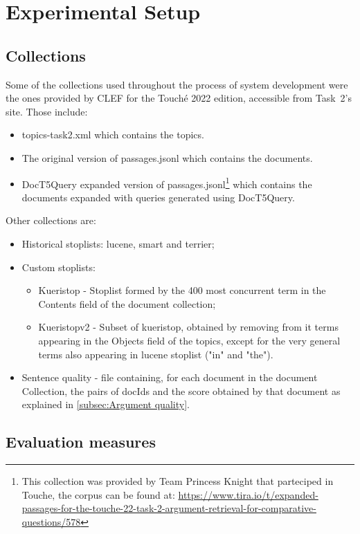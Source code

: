 \section{Experimental Setup}
\label{sec:setup}

\subsection{Collections}

	Some of the collections used throughout the process of system development were the ones provided by CLEF for the Touché 2022 edition, accessible from Task~2's site. Those include:

	\begin{itemize}
		\item topics-task2.xml which contains the topics.
		\item The original version of passages.jsonl which contains the documents.
		\item DocT5Query expanded version of passages.jsonl\footnote{This collection was provided by Team Princess Knight that parteciped in Touche, the corpus can be found at: \url{https://www.tira.io/t/expanded-passages-for-the-touche-22-task-2-argument-retrieval-for-comparative-questions/578}} which contains the documents expanded with queries generated using DocT5Query. \citep{nogueira:2019}
	\end{itemize}

	Other collections are:
	\begin{itemize}
		\item Historical stoplists: lucene, smart and terrier;
		\item Custom stoplists:
			\begin{itemize}
				\item Kueristop - Stoplist formed by the 400 most concurrent term in the Contents field of the document collection;
				\item Kueristopv2 - Subset of kueristop, obtained by removing from it terms appearing in the Objects field of the topics, except for the very general terms also appearing in lucene stoplist ("in" and "the").
			\end{itemize}
		\item Sentence quality - file containing, for each document in the document Collection, the pairs of docIds and the score obtained by that document as explained in \ref{subsec:Argument quality}.
	\end{itemize}
	

\subsection{Evaluation measures}


